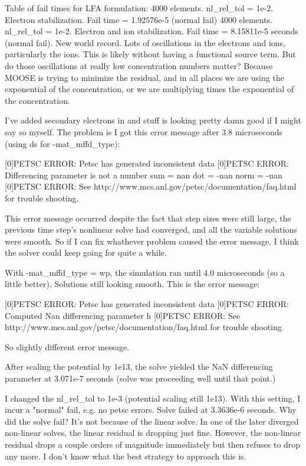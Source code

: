 Table of fail times for LFA formulation:
4000 elements. nl_rel_tol = 1e-2. Electron stabilization. Fail time = 1.92576e-5 (normal fail)
4000 elements. nl_rel_tol = 1e-2. Electron and ion stabilization. Fail time = 8.15811e-5 seconds (normal fail). New world record. Lots of oscillations in the electrons and ions, particularly the ions. This is likely without having a functional source term. But do those oscillations at really low concentration numbers matter? Because MOOSE is trying to minimize the residual, and in all places we are using the exponential of the concentration, or we are multiplying times the exponential of the concentration.

I've added secondary electrons in and stuff is looking pretty damn good if I might say so myself. The problem is I got this error message after 3.8 microseconds (using ds for -mat_mffd_type):

[0]PETSC ERROR: Petsc has generated inconsistent data
[0]PETSC ERROR: Differencing parameter is not a number sum = nan dot = -nan norm = -nan
[0]PETSC ERROR: See http://www.mcs.anl.gov/petsc/documentation/faq.html for trouble shooting.

This error message occurred despite the fact that step sizes were still large, the previous time step's nonlinear solve had converged, and all the variable solutions were smooth. So if I can fix whathever problem caused the error message, I think the solver could keep going for quite a while.

With -mat_mffd_type = wp, the simulation ran until 4.0 microseconds (so a little better). Solutions still looking smooth. This is the error message:

[0]PETSC ERROR: Petsc has generated inconsistent data
[0]PETSC ERROR: Computed Nan differencing parameter h
[0]PETSC ERROR: See http://www.mcs.anl.gov/petsc/documentation/faq.html for trouble shooting.

So slightly different error message.

After scaling the potential by 1e13, the solve yielded the NaN differencing parameter at 3.071e-7 seconds (solve was proceeding well until that point.)

I changed the nl_rel_tol to 1e-3 (potential scaling still 1e13). With this setting, I incur a "normal" fail, e.g. no petsc errors. Solve failed at 3.3636e-6 seconds. Why did the solve fail? It's not because of the linear solve. In one of the later diverged non-linear solves, the linear residual is dropping just fine. However, the non-linear residual drops a couple orders of magnitude immediately but then refuses to drop any more. I don't know what the best strategy to approach this is.

